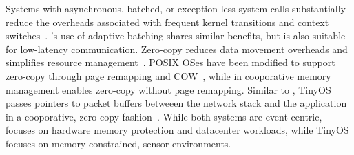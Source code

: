 Systems with asynchronous, batched, or exception-less system calls
substantially reduce the overheads associated with frequent kernel
transitions and context switches~\cite{DBLP:conf/osdi/HanMCR12,jeong2014mtcp,DBLP:journals/cacm/Rizzo12,DBLP:conf/osdi/SoaresS10}. \ix's use of adaptive batching shares similar benefits, but is also
suitable for low-latency communication.
Zero-copy reduces data movement overheads and simplifies resource
management~\cite{DBLP:journals/tocs/PaiDZ00}. POSIX OSes 
have been modified to support zero-copy through page remapping and COW~\cite{DBLP:conf/usenix/Chu96},
while in \ix cooporative memory management enables zero-copy without
page remapping. Similar to \ix, TinyOS passes pointers to packet buffers betweeen
the network stack and the application in a cooporative, zero-copy fashion~\cite{tinyosnet}.
While both systems are event-centric, \ix focuses on hardware memory protection and
datacenter workloads, while TinyOS focuses on memory constrained, sensor environments.


